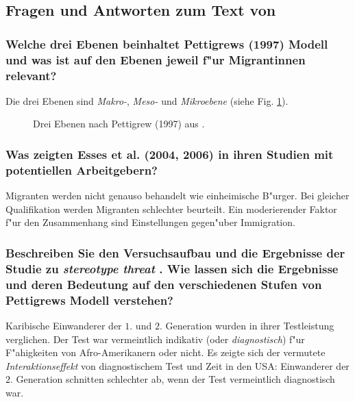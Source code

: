 \subsection{Fragen und Antworten zum Text von \textcite{deaux_nation_2006}}
\subsubsection{Welche drei Ebenen beinhaltet Pettigrews (1997) Modell und was ist auf den Ebenen jeweil f"ur Migrantinnen relevant?}
Die drei Ebenen sind \emph{Makro-}, \emph{Meso-} und \emph{Mikroebene} (siehe Fig. \ref{fig:deaux1}).

\begin{figure}[hb!]
        \begin{center}
        \end{center}
        \caption{Drei Ebenen nach Pettigrew (1997) aus \textcite{deaux_nation_2006}.}
        \label{fig:deaux1}
\end{figure}

\subsubsection{Was zeigten Esses et al. (2004, 2006) in ihren Studien mit potentiellen Arbeitgebern?}
Migranten werden nicht genauso behandelt wie einheimische B"urger. Bei gleicher Qualifikation werden Migranten schlechter beurteilt. Ein moderierender Faktor f"ur den Zusammenhang sind Einstellungen gegen"uber Immigration.

\subsubsection{Beschreiben Sie den Versuchsaufbau und die Ergebnisse der Studie zu \emph{stereotype threat} \parencite{deaux_nation_2006}. Wie lassen sich die Ergebnisse und deren Bedeutung auf den verschiedenen Stufen von Pettigrews Modell verstehen?}
Karibische Einwanderer der $1.$ und $2.$ Generation wurden in ihrer Testleistung verglichen. Der Test war vermeintlich indikativ (oder \emph{diagnostisch}) f"ur F"ahigkeiten von Afro-Amerikanern oder nicht. Es zeigte sich der vermutete \emph{Interaktionseffekt} von diagnostischem Test und Zeit in den USA: Einwanderer der $2.$ Generation schnitten schlechter ab, wenn der Test vermeintlich diagnostisch war.

